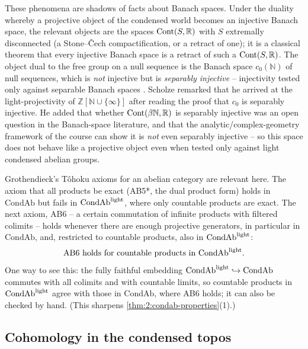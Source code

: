 \begin{remark}
\label{rmk:3:banach}
These phenomena are shadows of facts about Banach spaces. Under the duality
whereby a projective object of the condensed world becomes an injective Banach
space, the relevant objects are the spaces $\operatorname{Cont}(S,\mathbb{R})$ with $S$
extremally disconnected (a Stone--\v{C}ech compactification, or a retract of
one); it is a classical theorem that every injective Banach space is a retract of
such a $\operatorname{Cont}(S,\mathbb{R})$. The object dual to the free group on a null
sequence is the Banach space $c_0(\mathbb{N})$ of null sequences, which is
\emph{not} injective but is \emph{separably injective} -- injectivity tested
only against separable Banach spaces \cite{Avil_s_2016}. Scholze remarked that he
arrived at the light-projectivity of $\mathbb{Z}[\mathbb{N}\cup\{\infty\}]$ after
reading the proof that $c_0$ is separably injective. He added that
whether $\operatorname{Cont}(\beta\mathbb{N},\mathbb{R})$ is separably injective was an open
question in the Banach-space literature, and that the analytic/complex-geometry
framework of the course can show it is \emph{not} even separably injective -- so
this space does not behave like a projective object even when tested only against
light condensed abelian groups.
\end{remark}

\begin{remark}[AB axioms]
\label{rmk:3:ab-axioms}
Grothendieck's T\^ohoku axioms for an abelian category are relevant here. The
axiom that all products be exact (AB5*, the dual product form) holds in
$\mathrm{CondAb}$ but fails in $\mathrm{CondAb}^{\mathrm{light}}$, where only countable products are
exact. The next axiom, AB6 -- a certain commutation of infinite products with
filtered colimits -- holds whenever there are enough projective generators, in
particular in $\mathrm{CondAb}$, and, restricted to countable products, also in
$\mathrm{CondAb}^{\mathrm{light}}$:
\begin{equation*}
\text{AB6 holds for countable products in }\mathrm{CondAb}^{\mathrm{light}}.
\end{equation*}
One way to see this: the fully faithful embedding
$\mathrm{CondAb}^{\mathrm{light}}\hookrightarrow\mathrm{CondAb}$ commutes with all colimits and with
countable limits, so countable products in $\mathrm{CondAb}^{\mathrm{light}}$ agree with those in
$\mathrm{CondAb}$, where AB6 holds; it can also be checked by hand. (This
sharpens \cref{thm:2:condab-properties}(1).)
\end{remark}

\subsection{Cohomology in the condensed topos}

